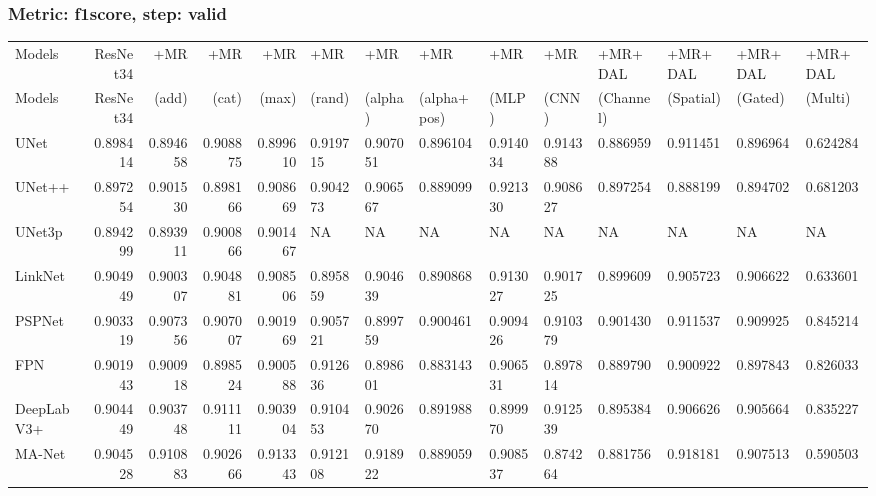 \documentclass{article}
\begin{document}
\subsubsection{Metric: f1score, step: valid}
\begin{tabular}{lrrrrlllllllll}
\toprule
Models & ResNet34 & +MR  & +MR  & +MR  & +MR  & +MR  & +MR  & +MR  & +MR  & +MR+DAL & +MR+DAL & +MR+DAL & +MR+DAL \\
Models & ResNet34 &  (add) &  (cat) &  (max) &  (rand) &  (alpha) &  (alpha+pos) &  (MLP) &  (CNN) & (Channel) & (Spatial) & (Gated) & (Multi) \\
\midrule
UNet & 0.898414 & 0.894658 & 0.908875 & 0.899610 & 0.919715 & 0.907051 & 0.896104 & 0.914034 & 0.914388 & 0.886959 & 0.911451 & 0.896964 & 0.624284 \\
UNet++ & 0.897254 & 0.901530 & 0.898166 & 0.908669 & 0.904273 & 0.906567 & 0.889099 & 0.921330 & 0.908627 & 0.897254 & 0.888199 & 0.894702 & 0.681203 \\
UNet3p & 0.894299 & 0.893911 & 0.900866 & 0.901467 & NA & NA & NA & NA & NA & NA & NA & NA & NA \\
LinkNet & 0.904949 & 0.900307 & 0.904881 & 0.908506 & 0.895859 & 0.904639 & 0.890868 & 0.913027 & 0.901725 & 0.899609 & 0.905723 & 0.906622 & 0.633601 \\
PSPNet & 0.903319 & 0.907356 & 0.907007 & 0.901969 & 0.905721 & 0.899759 & 0.900461 & 0.909426 & 0.910379 & 0.901430 & 0.911537 & 0.909925 & 0.845214 \\
FPN & 0.901943 & 0.900918 & 0.898524 & 0.900588 & 0.912636 & 0.898601 & 0.883143 & 0.906531 & 0.897814 & 0.889790 & 0.900922 & 0.897843 & 0.826033 \\
DeepLabV3+ & 0.904449 & 0.903748 & 0.911111 & 0.903904 & 0.910453 & 0.902670 & 0.891988 & 0.899970 & 0.912539 & 0.895384 & 0.906626 & 0.905664 & 0.835227 \\
MA-Net & 0.904528 & 0.910883 & 0.902666 & 0.913343 & 0.912108 & 0.918922 & 0.889059 & 0.908537 & 0.874264 & 0.881756 & 0.918181 & 0.907513 & 0.590503 \\
\bottomrule
\end{tabular}
\end{document}
